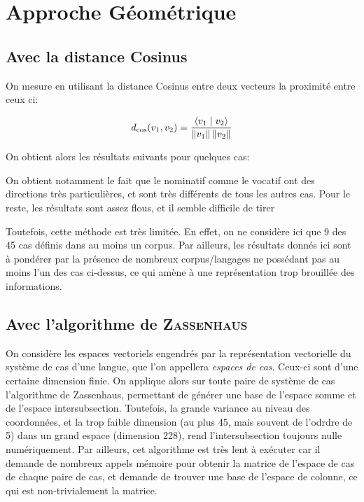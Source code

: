 \documentclass{cours}
\begin{document}
\section{Approche Géométrique}

\subsection{Avec la distance Cosinus}
On mesure en utilisant la distance Cosinus entre deux vecteurs la proximité entre ceux ci:

\begin{equation}
	d_{\cos}(v_{1},v_{2}) = \frac{\left\langle v_{1}\mid v_{2} \right\rangle}{\left\lVert v_{1} \right\rVert\left\lVert v_{2} \right\rVert}
\end{equation}

On obtient alors les résultats suivants pour quelques cas:







On obtient notamment le fait que le nominatif comme le vocatif ont des directions très particulières, et sont très différents de tous les autres cas. Pour le reste, les résultats sont assez flous, et il semble difficile de tirer

Toutefois, cette méthode est très limitée. En effet, on ne considère ici que 9 des 45 cas définis dans au moins un corpus. Par ailleurs, les résultats donnés ici sont à pondérer par la présence de nombreux corpus/langages ne possédant pas au moins l'un des cas ci-dessus, ce qui amène à une représentation trop brouillée des informations.


\subsection{Avec l'algorithme de \textsc{Zassenhaus}}
On considère les espaces vectoriels engendrés par la représentation vectorielle du système de cas d'une langue, que l'on appellera \textit{espaces de cas}.
Ceux-ci sont d'une certaine dimension finie.
On applique alors sur toute paire de système de cas l'algorithme de Zassenhaus, permettant de générer une base de l'espace somme et de l'espace intersubsection.
Toutefois, la grande variance au niveau des coordonnées, et la trop faible dimension (au plus 45, mais souvent de l'odrdre de 5) dans un grand espace (dimension 228), rend l'intersubsection toujours nulle numériquement.
Par ailleurs, cet algorithme est très lent à exécuter car il demande de nombreux appels mémoire pour obtenir la matrice de l'espace de cas de chaque paire de cas, et demande de trouver une base de l'espace de colonne, ce qui est non-trivialement la matrice.
\end{document}
